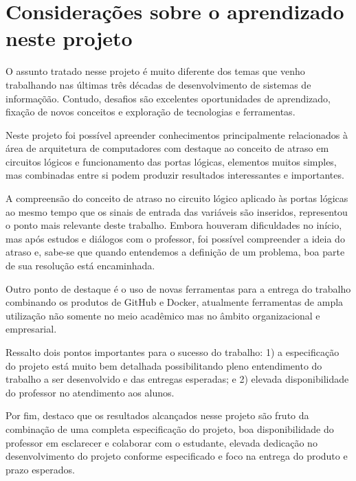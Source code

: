 
\section{Considerações sobre o aprendizado neste projeto}

O assunto tratado nesse projeto é muito diferente dos temas que venho trabalhando nas últimas três décadas
de desenvolvimento de sistemas de informaçõão. Contudo, desafios são excelentes oportunidades de aprendizado, 
fixação de novos conceitos e exploração de tecnologias e ferramentas.

Neste projeto foi possível apreender conhecimentos principalmente relacionados à área de arquitetura de computadores 
com destaque ao conceito de atraso em circuitos lógicos e funcionamento das portas lógicas,
elementos muitos simples, mas combinadas entre si podem produzir resultados interessantes e importantes.

A compreensão do conceito de atraso no circuito lógico aplicado às portas lógicas 
ao mesmo tempo que os sinais de entrada das variáveis são inseridos, representou 
o ponto mais relevante deste trabalho. Embora houveram dificuldades no início, mas 
após estudos e diálogos com o professor, foi possível compreender a ideia do atraso e, sabe-se  que quando entendemos 
a definição de um problema, boa parte de sua resolução está encaminhada.

Outro ponto de destaque é o uso de novas ferramentas para a entrega do trabalho combinando os produtos 
de GitHub e Docker, 
atualmente ferramentas de ampla utilização não somente no meio acadêmico mas no âmbito organizacional e empresarial.

Ressalto dois pontos importantes para o sucesso do trabalho: 1) a especificação do projeto está muito bem detalhada 
possibilitando pleno entendimento do trabalho a ser desenvolvido e das entregas esperadas; e 2) elevada disponibilidade 
do professor no atendimento aos alunos.

Por fim, destaco que os resultados alcançados nesse projeto são fruto da combinação de uma completa especificação 
do projeto, boa disponibilidade do professor em esclarecer e colaborar com o estudante,
elevada dedicação no desenvolvimento do projeto conforme especificado e foco na entrega do produto e prazo 
esperados.

